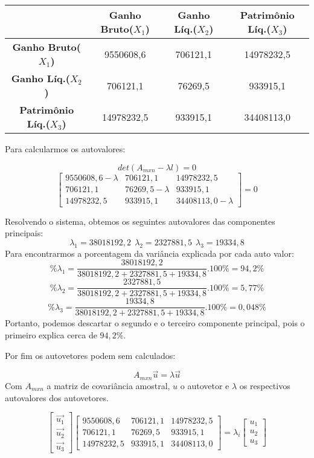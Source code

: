 \documentclass[
  openany]{book}
\begin{document}
\begin{longtable}[]{@{}cccc@{}}
\toprule
& \textbf{Ganho Bruto(\(X_1\))} & \textbf{Ganho Líq.(\(X_2\))} & \textbf{Patrimônio Líq.(\(X_3\))}\tabularnewline
\midrule
\endhead
\textbf{Ganho Bruto(\(X_1\))} & 9550608,6 & 706121,1 & 14978232,5\tabularnewline
\textbf{Ganho Líq.(\(X_2\))} & 706121,1 & 76269,5 & 933915,1\tabularnewline
\textbf{Patrimônio Líq.(\(X_3\))} & 14978232,5 & 933915,1 & 34408113,0\tabularnewline
\bottomrule
\end{longtable}

Para calcularmos os autovalores:

\[det(A_{mxn}-\lambda l)=0\]
\[\begin{bmatrix}
9550608,6 -\lambda &706121,1 &14978232,5\\ 
706121,1 &76269,5-\lambda & 933915,1 \\
14978232,5&933915,1&34408113,0-\lambda
\end{bmatrix}=0\]

Resolvendo o sistema, obtemos os seguintes autovalores das componentes principais:
\[\lambda_1=38018192,2 \ \ \lambda_2=2327881,5 \ \ \lambda_3=19334,8\]
Para encontrarmos a porcentagem da variância explicada por cada auto valor:
\[\%\lambda_1=\frac{38018192,2}{38018192,2+2327881,5+19334,8}.100\%=94,2\% \] \[\%\lambda_2=\frac{2327881,5}{38018192,2+2327881,5+19334,8}.100\%=5,77\% \] \[\%\lambda_3=\frac{19334,8}{38018192,2+2327881,5+19334,8}.100\%=0,048\%\]
Portanto, podemos descartar o segundo e o terceiro componente principal, pois o primeiro explica cerca de \(94,2\%\).

Por fim os autovetores podem sem calculados:

\[A_{mxn}\vec{u}=\lambda \vec{u}\]
Com \(A_{mxn}\) a matriz de covariância amostral, \(u\) o autovetor e \(\lambda\) os respectivos autovalores dos autovetores.

\[\begin{bmatrix}
\vec{u_1}\\ \vec{u_2} \\ \vec{u_3}
\end{bmatrix}
\begin{bmatrix}
9550608,6  &706121,1 &14978232,5\\ 
706121,1 &76269,5 & 933915,1 \\
14978232,5&933915,1&34408113,0
\end{bmatrix}  = \lambda_i \begin{bmatrix}
u_1\\ u_2 \\ u_3
\end{bmatrix} \]
\end{document}
